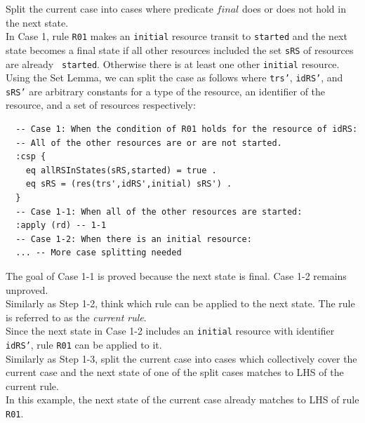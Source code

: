 \documentclass[12pt]{report}
\begin{document}
 Split the current case into cases where
predicate $final$ does or does not hold in the next state.\\ 
In Case 1, rule {\tt R01} makes an {\tt initial} resource transit to
{\tt started} and the next state becomes a final state if all other
resources included the set {\tt sRS} of resources are already {\tt
  started}. Otherwise there is at least one other {\tt initial}
resource.  Using the Set Lemma, we can split the case as follows where
{\tt trs'}, {\tt idRS'}, and {\tt sRS'} are arbitrary constants for a
type of the resource, an identifier of the resource, and a set of
resources respectively:
\small
\begin{verbatim}
  -- Case 1: When the condition of R01 holds for the resource of idRS:
  -- All of the other resources are or are not started.
  :csp {
    eq allRSInStates(sRS,started) = true .
    eq sRS = (res(trs',idRS',initial) sRS') .
  }
  -- Case 1-1: When all of the other resources are started:
  :apply (rd) -- 1-1
  -- Case 1-2: When there is an initial resource:
  ... -- More case splitting needed
\end{verbatim}
\normalsize
The goal of Case 1-1 is proved because the next state is final.  Case
1-2 remains unproved.\\

 Similarly as Step 1-2, think which rule can
be applied to the next state. The rule is referred to as the {\it current
rule}.\\
Since the next state in Case 1-2 includes an {\tt initial} resource
with identifier {\tt idRS'}, rule {\tt R01} can be applied to it.\\

 Similarly as Step 1-3, split the current case
into cases which collectively cover the current case and the next state of one of the split cases
matches to LHS of the current rule. \\ 
In this example, the next state of the current case already matches to LHS of rule {\tt R01}.\\
\end{document}
